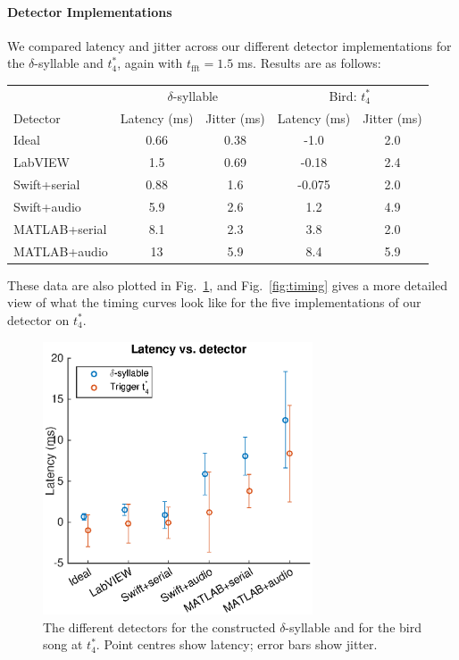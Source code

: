 \documentclass[10pt,letterpaper]{article}
\newcommand\fig[1]{Fig.~\ref{#1}}
\renewcommand{\subsubsection}[1]{\paragraph{#1}}
\begin{document}
\subsubsection{Detector Implementations}


We compared latency and jitter across our different detector
implementations for the $\delta$-syllable and $t^*_4$, again with
$t_\mathrm{fft}=1.5$ ms.  Results are as follows:
\vspace{8pt}
\begin{tabular}{l|c|c|c| c}
  & \multicolumn{2}{c}{$\delta$-syllable} & \multicolumn{2}{c}{Bird: $t^*_4$} \\
  Detector & Latency (ms) & Jitter (ms) & Latency (ms) & Jitter (ms) \\
  \hline
  Ideal & 0.66 & 0.38 & -1.0 & 2.0 \\
  LabVIEW & 1.5 & 0.69 & -0.18 & 2.4 \\
  Swift+serial & 0.88 & 1.6 & -0.075 & 2.0 \\
  Swift+audio & 5.9 & 2.6 & 1.2 & 4.9 \\
  MATLAB+serial & 8.1 & 2.3 & 3.8 & 2.0 \\
  MATLAB+audio & 13 & 5.9 & 8.4 & 5.9
\end{tabular}
\vspace{8pt}\par\noindent
These data are also plotted in \fig{fig:TimingVsDetector}, and
\fig{fig:timing} gives a more detailed view of what the timing curves
look like for the five implementations of our detector on $t^*_4$.

\begin{figure}
  \begin{center}
    \includegraphics[width=8cm]{Fig6}
  \end{center}
  \caption{The different detectors for the constructed
    $\delta$-syllable and for the bird song at $t^*_4$.  Point centres
    show latency; error bars show jitter.}
  \label{fig:TimingVsDetector}
\end{figure}
\end{document}
